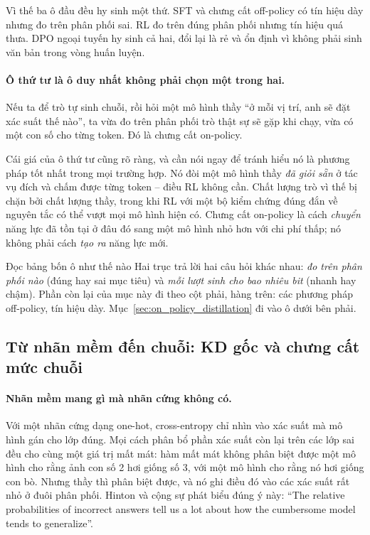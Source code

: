 Vì thế ba ô đầu đều hy sinh một thứ. SFT và chưng cất off-policy có tín hiệu dày nhưng đo trên phân phối sai. RL đo trên đúng phân phối nhưng tín hiệu quá thưa. DPO ngoại tuyến hy sinh cả hai, đổi lại là rẻ và ổn định vì không phải sinh văn bản trong vòng huấn luyện.

\paragraph{Ô thứ tư là ô duy nhất không phải chọn một trong hai.} Nếu ta để trò tự sinh chuỗi, rồi hỏi một mô hình thầy ``ở mỗi vị trí, anh sẽ đặt xác suất thế nào'', ta vừa đo trên phân phối trò thật sự sẽ gặp khi chạy, vừa có một con số cho từng token. Đó là chưng cất on-policy.

Cái giá của ô thứ tư cũng rõ ràng, và cần nói ngay để tránh hiểu nó là phương pháp tốt nhất trong mọi trường hợp. Nó đòi một mô hình thầy \emph{đã giỏi sẵn} ở tác vụ đích và chấm được từng token -- điều RL không cần. Chất lượng trò vì thế bị chặn bởi chất lượng thầy, trong khi RL với một bộ kiểm chứng đúng đắn về nguyên tắc có thể vượt mọi mô hình hiện có. Chưng cất on-policy là cách \emph{chuyển} năng lực đã tồn tại ở đâu đó sang một mô hình nhỏ hơn với chi phí thấp; nó không phải cách \emph{tạo ra} năng lực mới.

\begin{keyidea}{Đọc bảng bốn ô như thế nào}
Hai trục trả lời hai câu hỏi khác nhau: \emph{đo trên phân phối nào} (đúng hay sai mục tiêu) và \emph{mỗi lượt sinh cho bao nhiêu bit} (nhanh hay chậm). Phần còn lại của mục này đi theo cột phải, hàng trên: các phương pháp off-policy, tín hiệu dày. Mục~\ref{sec:on_policy_distillation} đi vào ô dưới bên phải.
\end{keyidea}

\subsection{Từ nhãn mềm đến chuỗi: KD gốc và chưng cất mức chuỗi}
\label{ssec:seq_kd}

\paragraph{Nhãn mềm mang gì mà nhãn cứng không có.} Với một nhãn cứng dạng one-hot, cross-entropy chỉ nhìn vào xác suất mà mô hình gán cho lớp đúng. Mọi cách phân bổ phần xác suất còn lại trên các lớp sai đều cho cùng một giá trị mất mát: hàm mất mát không phân biệt được một mô hình cho rằng ảnh con số 2 hơi giống số 3, với một mô hình cho rằng nó hơi giống con bò. Nhưng thầy thì phân biệt được, và nó ghi điều đó vào các xác suất rất nhỏ ở đuôi phân phối. Hinton và cộng sự \cite{hinton2015distilling} phát biểu đúng ý này: ``The relative probabilities of incorrect answers tell us a lot about how the cumbersome model tends to generalize''.

